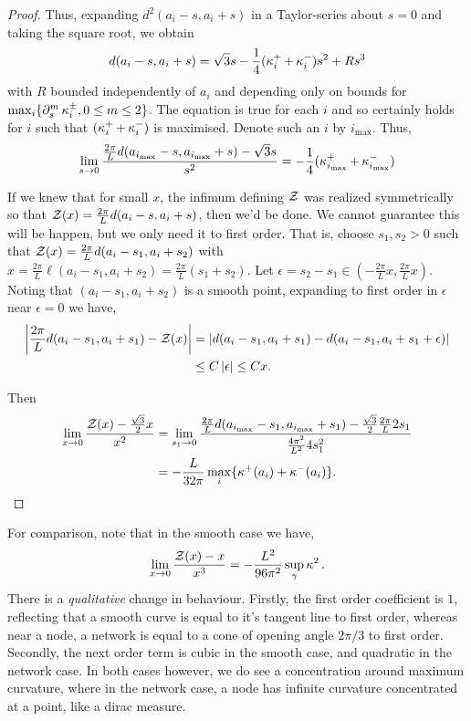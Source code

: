 \documentclass[12pt]{amsart}
\begin{document}
\begin{proof}
Thus, expanding \(d^2(a_i - s, a_i + s)\) in a Taylor-series about \(s = 0\) and taking the square root, we obtain
\[
d(a_i - s, a_i + s) = \sqrt{3} s - \frac{1}{4} (\operatorname{\kappa}^+_i + \operatorname{\kappa}^-_i) s^2 + R s^3
\]
with \(R\) bounded independently of \(a_i\) and depending only on bounds for \(\max_i \{\partial^{m}_s \operatorname{\kappa}_i^{\pm}, 0 \leq m \leq 2\}\). The equation is true for each \(i\) and so certainly holds for \(i\) such that \((\operatorname{\kappa}^+_i + \operatorname{\kappa}^-_i)\) is maximised. Denote such an \(i\) by \(i_{\max}\). Thus,
\[
\lim_{s\to 0} \frac{\tfrac{2\pi}{L} d(a_{i_{\max}} - s, a_{i_{\max}} + s) - \sqrt{3} s}{s^2} = - \frac{1}{4} (\operatorname{\kappa}^+_{i_{\max}} + \operatorname{\kappa}^-_{i_{\max}})
\]

If we knew that for small \(x\), the infimum defining \(\operatorname{\mathcal{Z}}\) was realized symmetrically so that \(\operatorname{\mathcal{Z}}(x) = \tfrac{2\pi}{L} d(a_i - s, a_i + s)\), then we'd be done. We cannot guarantee this will be happen, but we only need it to first order. That is, choose \(s_1, s_2 > 0\) such that \(\operatorname{\mathcal{Z}}(x) = \tfrac{2\pi}{L} d(a_i - s_1, a_i + s_2)\) with \(x = \tfrac{2\pi}{L} \ell(a_i - s_1, a_i + s_2) = \tfrac{2\pi}{L} (s_1 + s_2)\). Let \(\epsilon = s_2 - s_1 \in (-\tfrac{2\pi}{L} x, \tfrac{2\pi}{L}x)\). Noting that \((a_i - s_1, a_i + s_2)\) is a smooth point, expanding to first order in \(\epsilon\) near \(\epsilon = 0\) we have,
\[
\begin{split}
\left|\frac{2\pi}{L} d(a_i - s_1, a_i + s_1) - \operatorname{\mathcal{Z}}(x)\right| &= \left|d(a_i - s_1, a_i + s_1) - d(a_i - s_1, a_i + s_1 + \epsilon)\right| \\
&\leq C\left|\epsilon\right| \leq C x.
\end{split}
\]

Then
\[
\begin{split}
\lim_{x\to 0} \frac{\operatorname{\mathcal{Z}}(x) - \tfrac{\sqrt{3}}{2}x}{x^2} &= \lim_{s_1\to 0} \frac{\tfrac{2\pi}{L} d(a_{i_{\max}} - s_1, a_{i_{\max}} + s_1) - \tfrac{\sqrt{3}}{2} \tfrac{2\pi}{L} 2s_1}{\tfrac{4\pi^2}{L^2} 4 s_1^2} \\
&= - \frac{L}{32\pi} \max_i \{\operatorname{\kappa}^+(a_i) + \operatorname{\kappa}^-(a_i)\}.
\end{split}
\]
\end{proof}

\begin{remark}
For comparison, note that in the smooth case we have,
\[
\lim_{x\to 0} \frac{\operatorname{\mathcal{Z}}(x) - x}{x^3} = - \frac{L^2}{96 \pi^2} \sup_{\gamma} \operatorname{\kappa}^2.
\]
There is a \emph{qualitative} change in behaviour. Firstly, the first order coefficient is \(1\), reflecting that a smooth curve is equal to it's tangent line to first order, whereas near a node, a network is equal to a cone of opening angle \(2\pi/3\) to first order.  Secondly, the next order term is cubic in the smooth case, and quadratic in the network case. In both cases however, we do see a concentration around maximum curvature, where in the network case, a node has infinite curvature concentrated at a point, like a dirac measure.
\end{remark}
\end{document}
